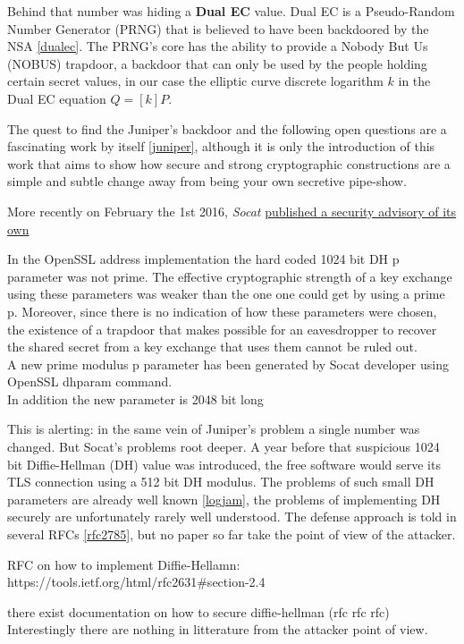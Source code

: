 \documentclass[a4paper,11pt]{article}
\begin{document}
Behind that number was hiding a \textbf{Dual EC} value. Dual EC is a Pseudo-Random Number Generator (PRNG) that is believed to have been backdoored by the NSA \ref{dualec}. The PRNG's core has the ability to provide a Nobody But Us (NOBUS) trapdoor, a backdoor that can only be used by the people holding certain secret values, in our case the elliptic curve discrete logarithm $k$ in the Dual EC equation $Q = [k]P$.

The quest to find the Juniper's backdoor and the following open questions are a fascinating work by itself \ref{juniper}, although it is only the introduction of this work that aims to show how secure and strong cryptographic constructions are a simple and subtle change away from being your own secretive pipe-show.

More recently on February the 1st 2016, \emph{Socat} \href{http://www.openwall.com/lists/oss-security/2016/02/01/4}{published a security advisory of its own}

\begin{displayquote}
In the OpenSSL address implementation the hard coded 1024 bit DH p parameter was not prime. The effective cryptographic strength of a key exchange using these parameters was weaker than the one one could get by using a prime p. Moreover, since there is no indication of how these parameters were chosen, the existence of a trapdoor that makes possible for an eavesdropper to recover the shared secret from a key exchange that uses them cannot be ruled out.\\
A new prime modulus p parameter has been generated by Socat developer using OpenSSL dhparam command.\\
In addition the new parameter is 2048 bit long
\end{displayquote}

This is alerting: in the same vein of Juniper's problem a single number was changed. But Socat's problems root deeper. A year before that suspicious 1024 bit Diffie-Hellman (DH) value was introduced, the free software would serve its TLS connection using a 512 bit DH modulus. The problems of such small DH parameters are already well known \ref{logjam}, the problems of implementing DH securely are unfortunately rarely well understood. The defense approach is told in several RFCs \ref{rfc2785}, but no paper so far take the point of view of the attacker.

RFC on how to implement Diffie-Hellamn: https://tools.ietf.org/html/rfc2631#section-2.4

there exist documentation on how to secure diffie-hellman (rfc rfc rfc) Interestingly there are nothing in litterature from the attacker point of view.
\end{document}
